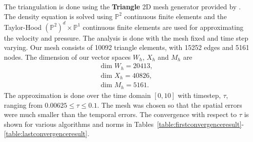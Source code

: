 \documentclass[letterpaper]{erdc}
\begin{document}
The triangulation is done using the \textbf{Triangle} 2D mesh generator provided by \cite{shewchuk1996triangle}.  The density equation is solved using $\mathbb{P}^2$ continuous finite elements and the Taylor-Hood $\left(\mathbb{P}^2\right)^d\times \mathbb{P}^1$ continuous finite elements are used for approximating the velocity and pressure.  The analysis is done with the mesh fixed and time step varying.  Our mesh consists of 10092 triangle elements, with 15252 edges and 5161 nodes.  The dimension of our vector spaces $W_h$, $X_h$ and $M_h$ are
\begin{align}
  \mbox{dim }W_h = 20413,\\
  \mbox{dim }X_h = 40826,\\
  \mbox{dim }M_h = 5161.
\end{align}
The approximation is done over the time domain $[0,10]$ with timestep, $\tau$, ranging from $0.00625\leq \tau \leq 0.1$.  The mesh was chosen so that the spatial errors were much smaller than the temporal errors.  The convergence with respect to $\tau$ is shown for various algorithms and norms in Tables~\ref{table:firstconvergenceresult}-\ref{table:lastconvergenceresult}.

%
%
\end{document}
